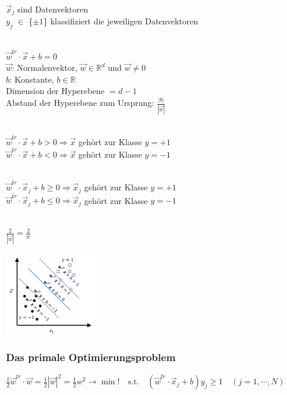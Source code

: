 $\vec{x}_j$ sind Datenvektoren\\
$y_j$ $\in $ \{$\pm 1$\} klassifiziert die jeweiligen Datenvektoren
\newline
\begin{minipage}[]{0.56\columnwidth}
    \\
    $\boxed{\vec{w}^{tr}\cdot\vec{x}+b=0}$ \\
    $\vec{w}$: Normalenvektor, $\vec{w} \in \mathbb{R}^d$ und $\vec{w} \neq 0$\\
    $b$: Konstante, $b \in \mathbb{R}$\\
    Dimension der Hyperebene $= d-1$\\
    Abstand der Hyperebene zum Ursprung: $\frac{\left\lvert b \right\rvert }{\left\lvert \vec{w}\right\rvert }$
    \medskip

    \\
    $\boxed{\vec{w}^{tr}\cdot\vec{x}+b>0} \Rightarrow \vec{x} $ gehört zur Klasse $y = +1$\\
    $\boxed{\vec{w}^{tr}\cdot\vec{x}+b<0} \Rightarrow \vec{x} $ gehört zur Klasse $y = -1$
    \medskip

    \\
    $\boxed{\vec{w}^{tr}\cdot\vec{x}_j+b \geq 0} \Rightarrow \vec{x}_j $ gehört zur Klasse $y = +1$\\
    $\boxed{\vec{w}^{tr}\cdot\vec{x}_j+b\leq 0} \Rightarrow \vec{x}_j $ gehört zur Klasse $y = -1$
    \medskip

    \\
    $\boxed{\frac{2}{\left\lvert \vec{w}\right\rvert }=\frac{2}{w}}$
\end{minipage}\hfill
\begin{minipage}[t]{0.4\columnwidth}
    \includegraphics[width=4cm]{images/7_model_values.png}
\end{minipage}

\subsubsection{Das primale Optimierungsproblem}
$\boxed{\frac12\vec{w}^{tr}\cdot\vec{w}=\frac12\left|\vec{w}\right|^2=\frac12w^2\to\min!\quad\mathrm{s.t.}\quad\left(\vec{w}^{tr}\cdot\vec{x}_j+b\right)y_j\geq1\quad\left(j=1,\cdots,N\right)}$

